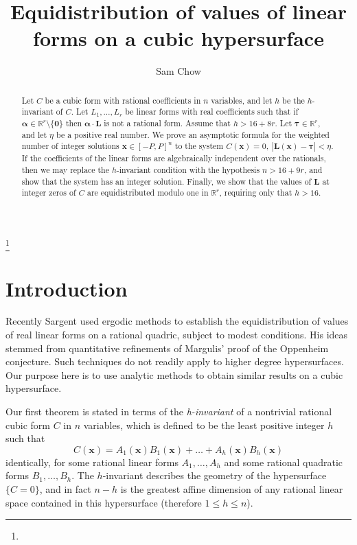 \documentclass[12pt,reqno]{amsart}
\theoremstyle{definition}
\theoremstyle{remark}
\numberwithin{equation}{section}
\begin{document}
\title[Equidistribution on a cubic hypersurface]{Equidistribution of values of linear forms on a cubic hypersurface}
\author[Sam Chow]{Sam Chow}
\address{School of Mathematics, University of Bristol, University Walk, Clifton, Bristol BS8 1TW, United Kingdom}
\thanks{}
\date{}
\begin{abstract} Let $C$ be a cubic form with rational coefficients in $n$ variables, and let $h$ be the $h$-invariant of $C$. Let $L_1, \ldots, L_r$ be linear forms with real coefficients such that if ${\boldsymbol{{\alpha}}} \in \mathbb{R}^r \setminus \{ \boldsymbol{0} \}$ then $\boldsymbol{{\alpha}} \cdot \mathbf{L}$ is not a rational form. Assume that $h > 16 + 8 r$. Let $\boldsymbol{\tau} \in \mathbb{R}^r$, and let $\eta$ be a positive real number. We prove an asymptotic formula for the weighted number of integer solutions \mbox{$\mathbf{x} \in [-P,P]^n$} to the system $C(\mathbf{x}) = 0, \: |\mathbf{L}(\mathbf{x}) - \boldsymbol{\tau}| < \eta$. If the coefficients of the linear forms are algebraically independent over the rationals, then we may replace the $h$-invariant condition with the hypothesis $n > 16 +  9 r$, and show that the system has an integer solution. Finally, we show that the values of $\mathbf{L}$ at integer zeros of $C$ are equidistributed modulo one in $\mathbb{R}^r$, requiring only that $h > 16$. 
\end{abstract}
\maketitle

\section{Introduction}
\label{intro}

Recently Sargent \cite{Sar2014} used ergodic methods to establish the equidistribution of values of real linear forms on a rational quadric, subject to modest conditions. His ideas stemmed from quantitative refinements \cite{DM1993, EMM1998} of Margulis' proof \cite{Mar1989} of the Oppenheim conjecture. Such techniques do not readily apply to higher degree hypersurfaces. Our purpose here is to use analytic methods to obtain similar results on a cubic hypersurface. 

Our first theorem is stated in terms of the \emph{h-invariant} of a nontrivial rational cubic form $C$ in $n$ variables, which is defined to be the least positive integer $h$ such that
\begin{equation} \label{hdef}
C({\mathbf x}) = A_1({\mathbf x})B_1({\mathbf x}) + \ldots + A_h({\mathbf x})B_h({\mathbf x})
\end{equation}
identically, for some rational linear forms $A_1, \ldots, A_h$ and some rational quadratic forms $B_1, \ldots, B_h$. The $h$-invariant describes the geometry of the hypersurface $\{ C=0 \}$, and in fact $n-h$ is the greatest affine dimension of any rational linear space contained in this hypersurface (therefore $1 {\leqslant} h {\leqslant} n$).
\end{document}
